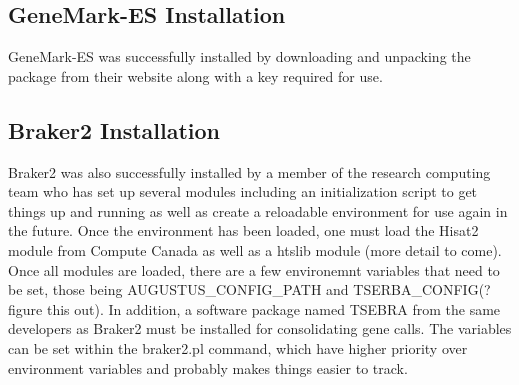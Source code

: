 \subsection{GeneMark-ES Installation}
GeneMark-ES was successfully installed by downloading and unpacking
the package from their website along with a key required for use.

\subsection{Braker2 Installation}
Braker2 was also successfully installed by a member of the research
computing team who has set up several modules including an
initialization script to get things up and running as well as create a
reloadable environment for use again in the future. Once the
environment has been loaded, one must load the Hisat2 module from
Compute Canada as well as a htslib module (more detail to come). Once
all modules are loaded, there are a few environemnt variables that
need to be set, those being AUGUSTUS\_CONFIG\_PATH and
TSERBA\_CONFIG(?figure this out). In addition, a software package named
TSEBRA from the same developers as Braker2 must be installed for
consolidating gene calls. The variables can be set within the
braker2.pl command, which have higher priority over environment
variables and probably makes things easier to track.
